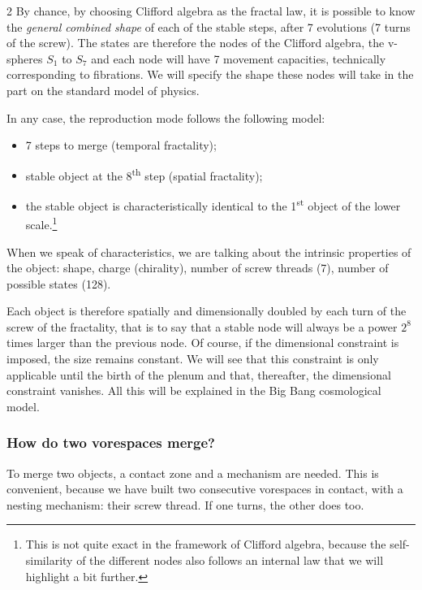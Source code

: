 \begin{multicols}{2}
	By chance, by choosing Clifford algebra as the fractal law, 
	it is possible to know the \textit{general combined shape} of each 
	of the stable steps, after 7 evolutions (7 turns of the screw). The states are 
	therefore the nodes of the Clifford algebra, the v-spheres $S_1$ to $S_7$ and each 
	node will have 7 movement capacities, technically corresponding to fibrations. We 
	will specify the shape these nodes will take in the part on the standard model 
	of physics.
	\medskip
	
	In any case, the reproduction mode follows the following model:
	
	\begin{itemize}
		\item 7 steps to merge (temporal fractality);
		\item stable object at the 8\textsuperscript{th} step (spatial fractality);
		\item the stable object is characteristically identical to the 1\textsuperscript{st} object of 
		the lower scale.\footnote{This is not quite exact in the framework of Clifford algebra, because the self-similarity of the different nodes also follows an internal law that we will highlight a bit further.} 
	\end{itemize}
	
	
	When we speak of characteristics, we are talking about the 
	intrinsic properties of the object: shape, charge (chirality), number of 
	screw threads (7), number of possible states (128).
	
	Each object is therefore spatially and dimensionally doubled by 
	each turn of the screw of the fractality, that is to say that a stable 
	node will always be a power $2^8$ times larger than the previous node. 
	Of course, if the dimensional constraint is imposed, the size 
	remains constant. We will see that this constraint is only applicable 
	until the birth of the plenum and that, thereafter, the 
	dimensional constraint vanishes. All this will be explained in the 
	Big Bang cosmological model.
	
	\subsubsection*{How do two vorespaces merge?}
	
	To merge two objects, a contact zone and a 
	mechanism are needed. This is convenient, because we have built two 
	consecutive vorespaces in contact, with a nesting mechanism: their 
	screw thread. If one turns, the other does too.
	

\end{multicols}
